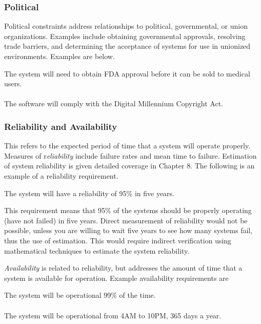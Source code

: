 \subsubsection*{Political}
\label{subsection:political}

Political constraints address relationships to political, governmental,
or union organizations. Examples include obtaining governmental
approvals, resolving trade barriers, and determining the acceptance of
systems for use in unionized environments. Examples are below.

\begin{itquote}
The system will need to obtain FDA approval before it can be sold to
medical users.\\ \\
The software will comply with the Digital Millennium Copyright Act.
\end{itquote}

\subsubsection*{Reliability and Availability}
\label{subsection:reliability-and-availability}

This refers to the expected period of time that a system will operate
properly. Measures of r\emph{eliability} include failure rates and mean
time to failure. Estimation of system reliability is given detailed
coverage in Chapter 8. The following is an example of a reliability
requirement.

\begin{itquote}
The system will have a reliability of 95\% in five years.
\end{itquote}

This requirement means that 95\% of the systems should be properly
operating (have not failed) in five years. Direct measurement of
reliability would not be possible, unless you are willing to wait five
years to see how many systems fail, thus the use of estimation. This
would require indirect verification using mathematical techniques to
estimate the system reliability.

\emph{Availability} is related to reliability, but addresses the amount
of time that a system is available for operation. Example availability
requirements are

\begin{itquote}
The system will be operational 99\% of the time.\\ \\
The system will be operational from 4AM to 10PM, 365 days a year.
\end{itquote}

